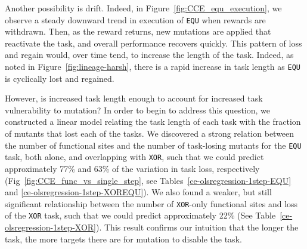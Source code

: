 \documentclass[10pt,letterpaper,final]{article}
\begin{document}
Another possibility is drift. Indeed, in Figure~\ref{fig:CCE_equ_execution}, we observe a steady downward trend in execution of \texttt{EQU} when rewards are withdrawn. Then, as the reward returns, new mutations are applied that reactivate the task, and overall performance recovers quickly. This pattern of loss and regain would, over time tend, to increase the length of the task. Indeed, as noted in Figure~\ref{fig:lineage-harsh}, there is a rapid increase in task length as \texttt{EQU} is cyclically lost and regained. 

However, is increased task length enough to account for increased task vulnerability to mutation? In order to begin to address this question, we constructed a linear model relating the task length of each task with the fraction of mutants that lost each of the tasks. We discovered a strong relation between the number of functional sites and the number of task-losing mutants for the \texttt{EQU} task, both alone, and overlapping with \texttt{XOR}, such that we could predict approximately 77\% and 63\% of the variation in task loss, respectively (Fig~\ref{fig:CCE_func_vs_single_step}, see Tables~\ref{ce-olsregression-1step-EQU} and \ref{ce-olsregression-1step-XOREQU}). We also found a weaker, but still significant relationship between the number of \texttt{XOR}-only functional sites and loss of the \texttt{XOR} task, such that we could predict approximately 22\% (See Table~\ref{ce-olsregression-1step-XOR}). This result confirms our intuition that the longer the task, the more targets there are for mutation to disable the task.
\end{document}
